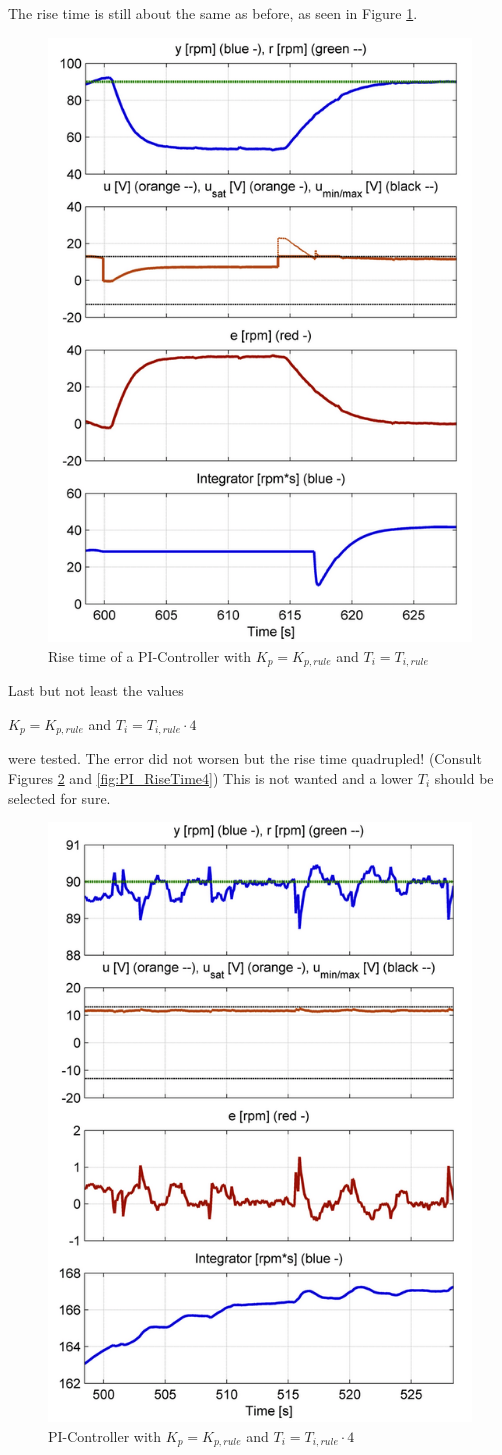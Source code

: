 The rise time is still about the same as before, as seen in Figure \ref{fig:PI_RiseTime1}.

\begin{figure}[H]
\begin{center}
\includegraphics[width=0.5\linewidth]{images/general/PI/PI_RiseTime1}
\end{center}
\caption{Rise time of a PI-Controller with $K_{p} = K_{p,rule}$ and $T_{i} = T_{i,rule}$}
\label{fig:PI_RiseTime1}
\end{figure}

Last but not least the values

\begin{center}
{$K_{p}= K_{p,rule}$ and $T_{i}=T_{i,rule}\cdot4$}
\end{center}

were tested. The error did not worsen but the rise time quadrupled!
(Consult Figures \ref{fig:PI_Controller4} and \ref{fig:PI_RiseTime4})
This is not wanted and a lower $T_i$ should be selected for sure.

\begin{figure}[H]
\begin{center}
\includegraphics[width=0.5\linewidth]{images/general/PI/PI_Controller4}
\end{center}
\caption{PI-Controller with $K_{p}= K_{p,rule}$ and $T_{i}=T_{i,rule}\cdot4$}
\label{fig:PI_Controller4}
\end{figure}


